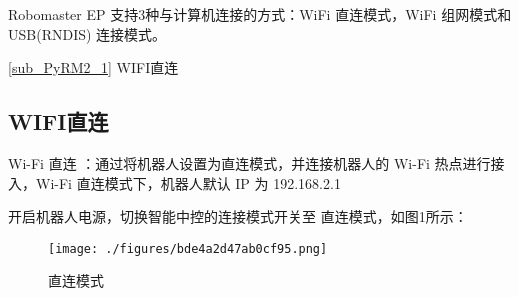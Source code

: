
Robomaster EP 支持3种与计算机连接的方式：WiFi 直连模式，WiFi 组网模式和 USB(RNDIS) 连接模式。

\autoref{sub_PyRM2_1} WIFI直连

\subsection{WIFI直连}\label{sub_PyRM2_1}

Wi-Fi 直连 ：通过将机器人设置为直连模式，并连接机器人的 Wi-Fi 热点进行接入，Wi-Fi 直连模式下，机器人默认 IP 为 192.168.2.1

开启机器人电源，切换智能中控的连接模式开关至 直连模式，如图1所示：

\begin{figure}[ht]
\centering
\texttt{[image: ./figures/bde4a2d47ab0cf95.png]}
\caption{直连模式} \label{fig_PyRM2_1}
\end{figure}
